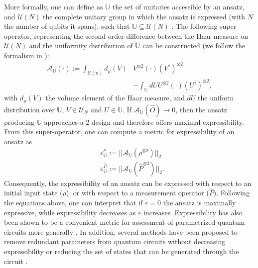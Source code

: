 More formally, one can define as $\mathbb{U}$ the set of unitaries accessible by an ansatz, and $\mathcal{U}(N)$ the complete unitary group in which the ansatz is expressed (with $N$ the number of qubits it spans), such that $\mathbb{U} \subseteq \mathcal{U}(N)$ \cite{Sim2019, Cerezo2021_BP, Holmes2021, Nakaji2021}.
The following super operator, representing the second order difference between the Haar measure on $\mathcal{U}(N)$ and the uniformity distribution of $\mathbb{U}$ can be constructed (we follow the formalism in \cite{Holmes2021}):
\begin{align} \label{eq:expressibility_integral}
    \mathcal{A_{\mathbb{U}}}(\cdot) := \int_{\mathcal{U}(n)} d_{\mu}(V)& V^{\otimes 2}(\cdot)(V^{\dagger})^{\otimes 2} \nonumber \\
    & - \int_{\mathbb{U}} dU U^{\otimes 2}(\cdot)(U^{\dagger})^{\otimes 2},
\end{align}
with $d_{\mu}(V)$ the volume element of the Haar measure, and $dU$ the uniform distribution over $\mathbb{U}$, $V \in \mathcal{U}_N$ and $U \in \mathbb{U}$. If $\mathcal{A}_\mathbb{U}(\hat{O}) \rightarrow 0$, then the ansatz producing $\mathbb{U}$ approaches a 2-design and therefore offers maximal expressibility. From this super-operator, one can compute a metric for expressibility of an ansatz as
\begin{align}
    &\varepsilon_{\mathbb{U}}^{\rho} := || \mathcal{A}_\mathbb{U}(\rho^{\otimes 2})||_2 \label{eq:expressibility_density} \\
    &\varepsilon_{\mathbb{U}}^{\hat{P}} := || \mathcal{A}_\mathbb{U}(\hat{P}^{\otimes 2})||_2. \label{eq:expressibility_operator} 
\end{align}
Consequently, the expressibility of an ansatz can be expressed with respect to an initial input state ($\rho$), or with respect to a measurement operator ($\hat{P}$). Following the equations above, one can interpret that if $\varepsilon = 0$ the ansatz is maximally expressive, while expressibility decreases as $\varepsilon$ increases.  
Expressibility has also been shown to be a convenient metric for assessment of parametrized quantum circuits more generally \cite{Nakaji2021}. In addition, several methods have been proposed to remove redundant parameters from quantum circuits without decreasing expressibility \cite{Rasmussen2020} or reducing the set of states that can be generated through the circuit \cite{Funcke2021}.

